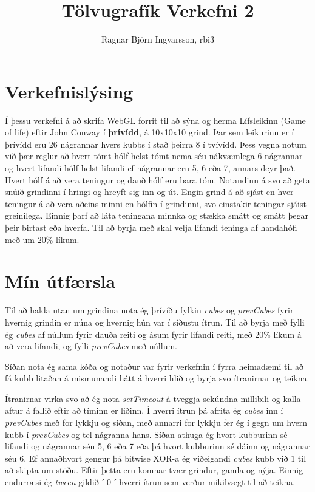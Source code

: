 \documentclass{article}
\title{Tölvugrafík Verkefni 2}
\author{Ragnar Björn Ingvarsson, rbi3}
\begin{document}
\renewcommand\thepage{}
	
	\maketitle

	\newpage
	\setcounter{page}{1}
	\renewcommand\thepage{\arabic{page}}

	\part{Verkefnislýsing}

	Í þessu verkefni á að skrifa WebGL forrit til að sýna og herma 
	Lífsleikinn (Game of life) eftir John Conway í \textbf{þrívídd}, á 
	10x10x10 grind. Þar sem leikurinn er í þrívídd eru 26 nágrannar hvers 
	kubbs í stað þeirra 8 í tvívídd. Þess vegna notum við þær reglur að 
	hvert tómt hólf helst tómt nema séu nákvæmlega 6 nágrannar og hvert 
	lifandi hólf helst lifandi ef nágrannar eru 5, 6 eða 7, annars deyr það. 
	Hvert hólf á að vera teningur og dauð hólf eru bara tóm. Notandinn á 
	svo að geta snúið grindinni í hringi og hreyft sig inn og út. 
	Engin grind á að sjást en hver teningur á að vera aðeins minni en 
	hólfin í grindinni, 
	svo einstakir teningar sjáist greinilega. Einnig þarf að láta teningana 
	minnka og stækka smátt og smátt þegar þeir birtast eða hverfa. Til að 
	byrja með skal velja lifandi teninga af handahófi með um $20\%$ líkum.

	\part{Mín útfærsla}

	Til að halda utan um grindina nota ég þrívíðu fylkin \textit{cubes} og 
	\textit{prevCubes} fyrir hvernig grindin er núna og hvernig hún var í 
	síðustu ítrun. Til að byrja með fylli ég \textit{cubes} af núllum fyrir 
	dauða reiti og ásum fyrir lifandi reiti, með $20\%$ líkum á að vera 
	lifandi, og fylli \textit{prevCubes} með núllum. 

	Síðan nota ég sama kóða og notaður var fyrir verkefnin í fyrra heimadæmi 
	til að fá kubb litaðan á mismunandi hátt á hverri hlið og byrja svo 
	ítranirnar og teikna.

	Ítranirnar virka svo að ég nota \textit{setTimeout} á tveggja sekúndna 
	millibili og kalla aftur á fallið eftir að tíminn er liðinn. Í hverri 
	ítrun þá afrita ég \textit{cubes} inn í \textit{prevCubes} með for 
	lykkju og síðan, með annarri for lykkju fer ég í gegn um hvern kubb í 
	\textit{prevCubes} og tel nágranna hans. Síðan athuga ég hvort kubburinn 
	sé lifandi og nágrannar séu 5, 6 eða 7 eða þá hvort kubburinn sé dáinn 
	og nágrannar séu 6. Ef annaðhvort gengur þá bitwise XOR-a ég viðeigandi 
	\textit{cubes} kubb við $1$ til að skipta um stöðu. Eftir þetta eru 
	komnar tvær grindur, gamla og nýja. Einnig endurræsi ég \textit{tween} 
	gildið í $0$ í hverri ítrun sem verður mikilvægt til að teikna.
\end{document}
